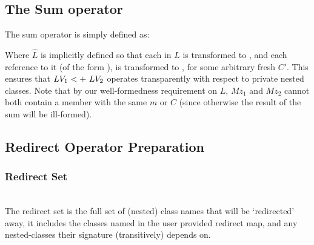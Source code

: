 \subsection{The Sum operator}
The sum operator is simply defined as:

\begin{defs}
{}
{}
\end{defs}
Where $\widehat{L}$ is implicitly defined so that each  in $L$ is transformed to , and each reference to it (of the form ), is transformed to , for some arbitrary fresh $C'$. This ensures that $\summ{LV_1}{LV_2}$ operates transparently with respect to private nested classes. Note that by our well-formedness requirement on $L$, $Mz_1$ and $Mz_2$ cannot both contain a member with the same $m$ or $C$ (since otherwise the result of the sum will be ill-formed).

\subsection{Redirect Operator Preparation}
\subsubsection{Redirect Set} \noindent\\ 
The redirect set is the full set of (nested) class names that will be `redirected' away, it includes the classes named in the user provided redirect map, and any nested-classes their signature (transitively) depends on.

